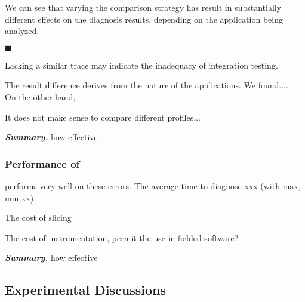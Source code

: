 We can see that varying the comparison strategy has result in
substantially different effects on the diagnosis results,
depending on the application being analyzed.

$\blacksquare$

Lacking a similar trace may indicate the inadequacy of
integration testing.

The result difference derives from the nature of the applications.
We found....  . On the other hand,

It does not make sense to compare different profiles...





\vspace{1mm}
\noindent \textbf{\textit{Summary.}} how effective

\subsubsection{Performance of \ourtool}

\ourtool performs very well on these errors. The average time
to diagnose xxx (with max, min xx).

The cost of slicing

The cost of instrumentation, permit the use in fielded software?




\vspace{1mm}
\noindent \textbf{\textit{Summary.}} how effective

\vspace{1mm}

\subsection{Experimental Discussions}


